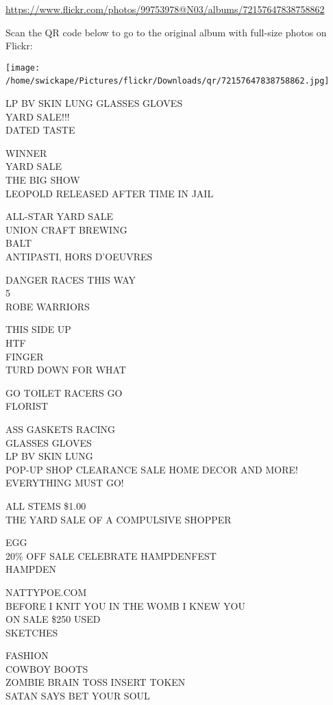 \documentclass[10pt,letterpaper]{article}
\begin{document}
\url{https://www.flickr.com/photos/99753978@N03/albums/72157647838758862}

Scan the QR code below to go to the original album with full-size photos on Flickr:

\texttt{[image: /home/swickape/Pictures/flickr/Downloads/qr/72157647838758862.jpg]}
\

LP BV SKIN LUNG GLASSES GLOVES\\
YARD SALE!!!\\
DATED TASTE

WINNER\\
YARD SALE\\
THE BIG SHOW\\
LEOPOLD RELEASED AFTER TIME IN JAIL

ALL{-}STAR YARD SALE\\
UNION CRAFT BREWING\\
BALT\\
ANTIPASTI, HORS D'OEUVRES

DANGER RACES THIS WAY\\
5\\
ROBE WARRIORS

THIS SIDE UP\\
HTF\\
FINGER\\
TURD DOWN FOR WHAT

GO TOILET RACERS GO\\
FLORIST

ASS GASKETS RACING\\
GLASSES GLOVES\\
LP BV SKIN LUNG\\
POP{-}UP SHOP CLEARANCE SALE HOME DECOR AND MORE! EVERYTHING MUST GO!

ALL STEMS \$1.00\\
THE YARD SALE OF A COMPULSIVE SHOPPER

EGG\\
20\% OFF SALE CELEBRATE HAMPDENFEST\\
HAMPDEN

NATTYPOE.COM\\
BEFORE I KNIT YOU IN THE WOMB I KNEW YOU\\
ON SALE \$250 USED\\
SKETCHES

FASHION\\
COWBOY BOOTS\\
ZOMBIE BRAIN TOSS INSERT TOKEN\\
SATAN SAYS BET YOUR SOUL
\end{document}
